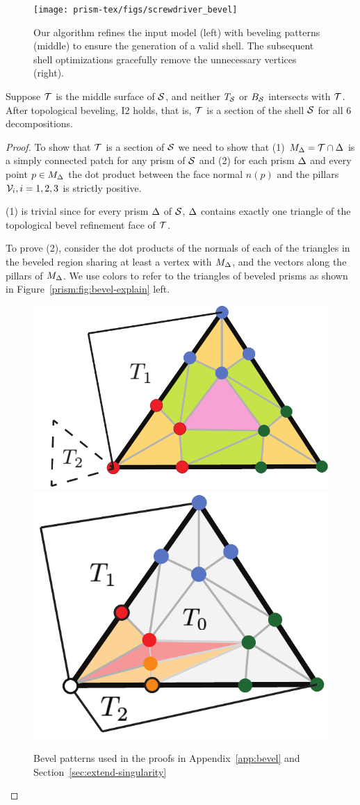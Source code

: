 \begin{figure}
    \texttt{[image: prism-tex/figs/screwdriver\_bevel]}
    \caption{Our algorithm refines the input model (left) with beveling patterns (middle) to ensure the generation of a valid shell. The subsequent shell optimizations gracefully remove the unnecessary vertices (right).}
    \label{prism:fig:beveled_example}
    
\end{figure}

\begin{theorem}
\label{thm:bevel}
Suppose $\T$ is the middle surface of $\S$, and neither $T_\S$ or $B_\S$ intersects with $\T$. After topological beveling, I2 holds, that is, $\T$ is a section of the shell $\S$ for all 6 decompositions.
\end{theorem}
\begin{proof}
    To show that $\T$ is a section of $\S$ we need to show that (1) $M_\Prism= \T \cap \Prism$ is a simply connected patch  for any prism of $\S$
and (2) for {each prism $\Prism$} and every point $p\in M_\Prism$ the dot product between the face normal $n(p)$ and the {pillars} $\V_i, i=1,2,3$ is strictly {positive}.

(1) is trivial since for every prism $\Prism$ of $\S$, $\Prism$ contains exactly one {triangle of the topological bevel refinement} face of $\T$.%


To prove (2), consider the dot products of the normals of each of the triangles in the beveled region sharing at least a vertex with $M_\Prism$, and the vectors along the pillars of $M_\Prism$.
We use colors to refer to the triangles of beveled prisms as shown in Figure~\ref{prism:fig:bevel-explain} left. 


\begin{figure}
    \centering
    \includegraphics[width=0.5\linewidth]{prism-tex/figs/bevel_colors}
    \includegraphics[width=0.4\linewidth]{prism-tex/figs/singularity-bevel-explained}
    \caption{Bevel patterns used in the proofs in Appendix~\ref{app:bevel} and Section~\ref{sec:extend-singularity}}
    

\end{figure}
\end{proof}
